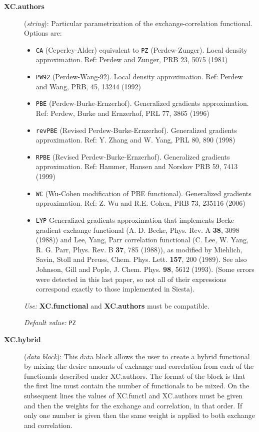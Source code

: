 \documentclass[11pt]{article}
\begin{document}
\begin{description}
\item[{\bf XC.authors}] ({\it string}): 
Particular parametrization of the
exchange-correlation functional. Options are:
\begin{itemize}
\item {\tt CA} (Ceperley-Alder) 
equivalent to {\tt PZ} (Perdew-Zunger). 
Local density approximation.
Ref: Perdew and Zunger, PRB 23, 5075 (1981)
\item {\tt PW92} (Perdew-Wang-92). 
Local density approximation.
Ref: Perdew and Wang, PRB, 45, 13244 (1992)
\item {\tt PBE} (Perdew-Burke-Ernzerhof). Generalized gradients
approximation.  Ref: Perdew, Burke and Ernzerhof, PRL 77, 3865
(1996) 
\item {\tt revPBE} (Revised Perdew-Burke-Ernzerhof). Generalized gradients
approximation.  Ref: Y. Zhang and W. Yang, PRL 80, 890 
(1998) 
\item {\tt RPBE} (Revised Perdew-Burke-Ernzerhof). Generalized gradients
approximation.  Ref: Hammer, Hansen and Norskov PRB 59, 7413 
(1999) 
\item {\tt WC} (Wu-Cohen modification of PBE functional). Generalized gradients
approximation.  Ref: Z. Wu and R.E. Cohen, PRB 73, 235116 (2006)
 
\item {\tt LYP} Generalized gradients approximation 
that implements Becke gradient exchange functional (A. D.
Becke, Phys. Rev. A {\bf 38}, 3098 (1988)) and Lee, Yang, Parr
correlation functional (C. Lee, W. Yang, R. G. Parr, Phys. Rev. B
{\bf 37}, 785 (1988)), as modified by Miehlich, Savin, Stoll and Preuss,
Chem. Phys. Lett. {\bf 157}, 200 (1989). See also Johnson, Gill and Pople,
J. Chem. Phys. {\bf 98}, 5612 (1993). (Some errors were detected in this
last paper, so not all of their expressions correspond exactly to those
implemented in {\sc Siesta}).

\end{itemize}

{\it Use:} {\bf XC.functional} and {\bf XC.authors} must be compatible.

{\it Default value:} {\tt PZ}

\item[{\bf XC.hybrid}] ({\it data block}): 
This data block allows the user to create a hybrid functional by
mixing the desire amounts of exchange and correlation from each of
the functionals described under XC.authors.
The format of the block is that the first line must contain the
number of functionals to be mixed. On the subsequent lines the
values of XC.functl and XC.authors must be given and then the
weights for the exchange and correlation, in that order. If only
one number is given then the same weight is applied to both
exchange and correlation.


\end{description}
\end{document}
